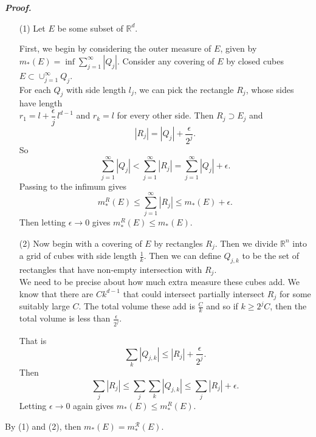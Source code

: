 \documentclass[a4paper,11pt]{article}
\begin{document}
\textbf{\textit{Proof.}}
\begin{enumerate}
	\item [(1)]
		Let $E$ be some subset of $\mathbb{R}^d$.

		First, we begin by considering the outer measure of $E$, given by $m_*(E) = \inf \sum_{j=1}^\infty |Q_j|$. Consider any covering of $E$ by closed cubes $E \subset \cup_{j=1}^\infty Q_j$.\\

		For each $Q_j$ with side length $l_j$, we can pick the rectangle $R_j$, whose sides have length\\$r_1 = l + \dfrac{\epsilon}{j}\,l^{d-1}$ and $r_k = l$ for every other side. Then $R_j \supset E_j$ and
			$$|R_j| = |Q_j| + \frac{\epsilon}{2^j}.$$
		So
			$$\sum_{j=1}^\infty |Q_j| < \sum_{j=1}^\infty |R_j| = \sum_{j=1}^\infty |Q_j| + \epsilon.$$
		Passing to the infimum gives
			$$m_*^R(E) \leq \sum_{j=1}^\infty |R_j| \leq m_*(E) + \epsilon.$$
		Then letting $\epsilon \to 0$ gives $m_*^R(E) \leq m_*(E)$.\\

	\item [(2)]
		Now begin with a covering of $E$ by rectangles $R_j$. Then we divide $\mathbb{R}^n$ into a grid of cubes with side length $\frac{1}{k}$. Then we can define $Q_{j,k}$ to be the set of rectangles that have non-empty intersection with $R_j$.\\

		We need to be precise about how much extra measure these cubes add. We know that there are $Ck^{d-1}$ that could intersect partially intersect $R_j$ for some suitably large $C$. The total volume these add is $\frac{C}{k}$ and so if $k \geq 2^j C$, then the total volume is less than $\frac{\epsilon}{2^j}$.

		That is
			$$\underset{k}{\sum} |Q_{j,k}| \leq |R_j| + \frac{\epsilon}{2^j}.$$
		Then
			$$\underset{j}{\sum} |R_j| \leq \underset{j}{\sum} \underset{k}{\sum} |Q_{j,k}| \leq \underset{j}{\sum} |R_j| + \epsilon.$$
		Letting $\epsilon \to 0$ again gives $m_*(E) \leq m_*^R(E)$.
\end{enumerate}
	By (1) and (2), then $m_*(E) = m_*^\mathcal{R}(E)$.



			
\end{document}

